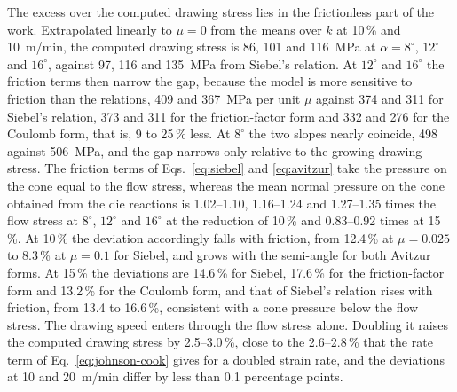 \documentclass[subscriptcorrection,upint,varvw,barcolor=Goldenrod3,mathalfa=cal=euler,balance,hyphenate,french,pdf-a]{asmejour} %
\begin{document}
The excess over the computed drawing stress lies in the frictionless part of the work. Extrapolated linearly to $\mu = 0$ from the means over $k$ at 10\,\% and 10~m/min, the
computed drawing stress is 86, 101 and 116~MPa at $\alpha = 8^\circ$, $12^\circ$ and $16^\circ$,
against 97, 116 and 135~MPa from Siebel's relation. At $12^\circ$ and $16^\circ$ the friction terms
then narrow the gap, because the model is more sensitive to friction than the relations, 409 and
367~MPa per unit $\mu$ against 374 and 311 for Siebel's relation, 373 and 311 for the friction-factor
form and 332 and 276 for the Coulomb form, that is, 9 to 25\,\% less. At $8^\circ$ the two slopes nearly
coincide, 498 against 506~MPa, and the gap narrows only relative to the growing drawing stress.
The friction terms of Eqs.~\eqref{eq:siebel} and \eqref{eq:avitzur} take the pressure on the cone
equal to the flow stress, whereas the mean normal pressure on the cone obtained from the die
reactions is 1.02--1.10, 1.16--1.24 and 1.27--1.35 times the flow stress at $8^\circ$, $12^\circ$
and $16^\circ$ at the reduction of 10\,\% and 0.83--0.92 times at 15\,\%. At 10\,\% the deviation
accordingly falls with friction, from 12.4\,\% at $\mu = 0.025$ to 8.3\,\% at $\mu = 0.1$ for
Siebel, and grows with the semi-angle for both Avitzur forms. At 15\,\% the deviations are
14.6\,\% for Siebel, 17.6\,\% for the friction-factor form and 13.2\,\% for the Coulomb form, and
that of Siebel's relation rises with friction, from 13.4 to 16.6\,\%, consistent with a cone
pressure below the flow stress. The drawing speed enters through the flow stress alone. Doubling
it raises the computed drawing stress by 2.5--3.0\,\%, close to the 2.6--2.8\,\% that the rate
term of Eq.~\eqref{eq:johnson-cook} gives for a doubled strain rate, and the deviations at 10 and
20~m/min differ by less than 0.1 percentage points.
\end{document}
